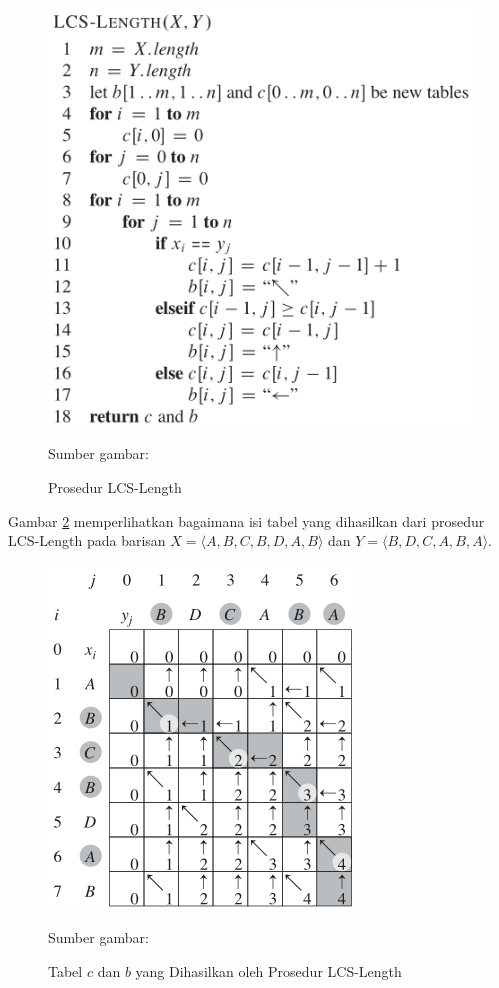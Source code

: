 \begin{figure}
  \centering
  \includegraphics[width=0.7\linewidth]{pics/prosedur_lcs}
  \caption{Prosedur LCS-Length}{Sumber gambar: \cite{Cormen:2009:IAT:1614191}}
  \label{fig:prosedurlcs}
\end{figure}

Gambar \ref{fig:tabellcs} memperlihatkan bagaimana isi tabel yang dihasilkan dari prosedur LCS-Length pada barisan $X=\langle A,B,C,B,D,A,B\rangle$ dan $Y=\langle B,D,C,A,B,A\rangle$.

\begin{figure}
  \centering
  \includegraphics[width=0.55\linewidth]{pics/tabel_lcs}
  \caption{Tabel $c$ dan $b$ yang Dihasilkan oleh Prosedur LCS-Length}{Sumber gambar: \cite{Cormen:2009:IAT:1614191}}
  \label{fig:tabellcs}
\end{figure}


